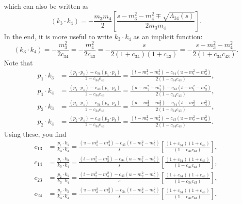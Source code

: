 which can also be written as
\begin{equation}
	\left( k_{3} \cdot k_{4} \right) = - \frac{m_{3} m_{4}}{2} \left[ \frac{s - m_{3}^{2} - m_{4}^{2} \mp \sqrt{\Lambda_{34}(s)}}{2m_{3} m_{4}} \right].
\end{equation}
In the end, it is more useful to write $k_{3} \cdot k_{4}$ as an implicit function:
\begin{equation}
	\left( k_{3} \cdot k_{4} \right) = - \frac{m_{3}^{2}}{2 c_{34}} = - \frac{m_{4}^{2}}{2 c_{43}} = - \frac{s}{2 \left(1 + c_{34} \right) \left(1 + c_{43} \right) } = -\frac{s - m_{3}^{2} - m_{4}^{2}}{2 \left(1 + c_{34} c_{43} \right)}.
\end{equation}
Note that
\begin{align}
	p_{1} \cdot k_{3} &= \frac{ \left( p_{1} \cdot p_{3} \right) - c_{34} \left( p_{1} \cdot p_{4} \right) }{1 - c_{34} c_{43}} = \frac{ \left( t - m_{1}^{2} - m_{3}^{2} \right) - c_{34} \left( u - m_{1}^{2} - m_{4}^{2} \right) }{2 \left( 1 - c_{34} c_{43} \right)}, \\
	p_{1} \cdot k_{4} &= \frac{ \left( p_{1} \cdot p_{4} \right) - c_{43} \left( p_{1} \cdot p_{3} \right) }{1 - c_{34} c_{43}} = \frac{ \left( u - m_{1}^{2} - m_{4}^{2} \right) - c_{43} \left( t - m_{1}^{2} - m_{3}^{2} \right) }{2 \left( 1 - c_{34} c_{43} \right)}, \\
	p_{2} \cdot k_{3} &= \frac{ \left( p_{2} \cdot p_{3} \right) - c_{34} \left( p_{2} \cdot p_{4} \right) }{1 - c_{34} c_{43}} = \frac{ \left( u - m_{2}^{2} - m_{3}^{2} \right) - c_{34} \left( t - m_{2}^{2} - m_{4}^{2} \right) }{2 \left( 1 - c_{34} c_{43} \right)}, \\
	p_{2} \cdot k_{4} &= \frac{ \left( p_{2} \cdot p_{4} \right) - c_{43} \left( p_{2} \cdot p_{3} \right) }{1 - c_{34} c_{43}} = \frac{ \left( t - m_{2}^{2} - m_{4}^{2} \right) - c_{43} \left( u - m_{2}^{2} - m_{3}^{2} \right) }{2 \left( 1 - c_{34} c_{43} \right)}.
\end{align}
Using these, you find
\begin{align}
	c_{13} &= \frac{p_{1} \cdot k_{4}}{k_{3} \cdot k_{4}} = \frac{ \left( u - m_{1}^{2} - m_{4}^{2} \right) - c_{43} \left( t - m_{1}^{2} - m_{3}^{2} \right) }{s} \left[ \frac{\left(1 + c_{34} \right) \left(1 + c_{43} \right)}{\left(1 - c_{34} c_{43} \right)} \right], \\
	c_{14} &= \frac{p_{1} \cdot k_{3}}{k_{3} \cdot k_{4}} = \frac{ \left( t - m_{1}^{2} - m_{3}^{2} \right) - c_{34} \left( u - m_{1}^{2} - m_{4}^{2} \right) }{s} \left[ \frac{\left(1 + c_{34} \right) \left(1 + c_{43} \right)}{\left(1 - c_{34} c_{43} \right)} \right], \\
	c_{23} &= \frac{p_{2} \cdot k_{4}}{k_{3} \cdot k_{4}} = \frac{ \left( t - m_{2}^{2} - m_{4}^{2} \right) - c_{43} \left( u - m_{2}^{2} - m_{3}^{2} \right) }{s} \left[ \frac{\left(1 + c_{34} \right) \left(1 + c_{43} \right)}{\left(1 - c_{34} c_{43} \right)} \right], \\
	c_{24} &= \frac{p_{2} \cdot k_{3}}{k_{3} \cdot k_{4}} = \frac{ \left( u - m_{2}^{2} - m_{3}^{2} \right) - c_{34} \left( t - m_{2}^{2} - m_{4}^{2} \right) }{s} \left[ \frac{\left(1 + c_{34} \right) \left(1 + c_{43} \right)}{\left(1 - c_{34} c_{43} \right)} \right].
\end{align}
